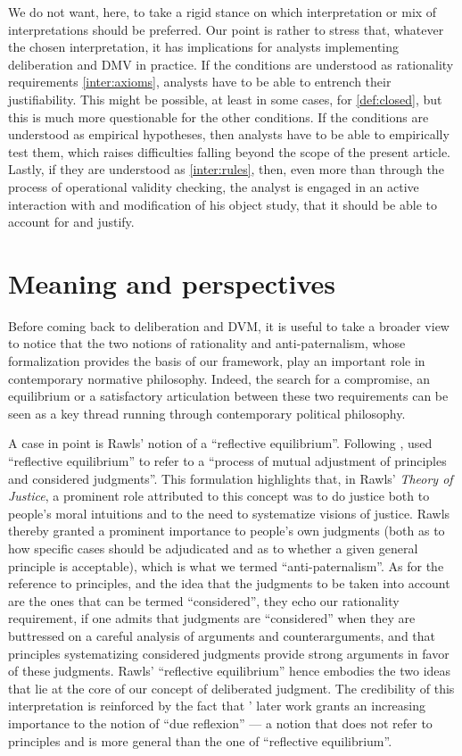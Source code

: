 \documentclass[version=3.21, pagesize, twoside=off, bibliography=totoc, DIV=calc, fontsize=12pt, a4paper, french, english]{scrartcl}
\begin{document}
We do not want, here, to take a rigid stance on which interpretation or mix of interpretations should be preferred. 
Our point is rather to stress that, whatever the chosen interpretation, it has implications for analysts implementing deliberation and DMV in practice. 
If the conditions are understood as rationality requirements \ref{inter:axioms}, analysts have to be able to entrench their justifiability. 
This might be possible, at least in some cases, for \cref{def:closed}, but this is much more questionable for the other conditions. 
If the conditions are understood as empirical hypotheses, then analysts have to be able to empirically test them, which raises difficulties falling beyond the scope of the present article.
Lastly, if they are understood as \ref{inter:rules}, then, even more than through the process of operational validity checking, the analyst is engaged in an active interaction with and modification of his object study, that it should be able to account for and justify.

\section{Meaning and perspectives}
\label{disc}
Before coming back to deliberation and DVM, it is useful to take a broader view to notice that the two notions of rationality and anti-paternalism, whose formalization provides the basis of our framework, play an important role in contemporary normative philosophy. 
Indeed, the search for a compromise, an equilibrium or a satisfactory articulation between these two requirements can be seen as a key thread running through contemporary political philosophy.

A case in point is Rawls’ notion of a “reflective equilibrium”. 
Following \citet{goodman_fact_1983}, \citet[][p. 18]{rawls_theory_1999} used “reflective equilibrium” to refer to a “process of mutual adjustment of principles and considered judgments”. 
This formulation highlights that, in Rawls' \emph{Theory of Justice}, a prominent role attributed to this concept was to do justice both to people's moral intuitions and to the need to systematize visions of justice. 
Rawls thereby granted a prominent importance to people's own judgments (both as to how specific cases should be adjudicated and as to whether a given general principle is acceptable), which is what we termed  “anti-paternalism”. 
As for the reference to principles, and the idea that the judgments to be taken into account are the ones that can be termed “considered”, they echo our rationality requirement, if one admits that judgments are  “considered” when they are buttressed on a careful analysis of arguments and counterarguments, and that principles systematizing considered judgments provide strong arguments in favor of these judgments. 
Rawls' “reflective equilibrium” hence embodies the two ideas that lie at the core of our concept of deliberated judgment. 
The credibility of this interpretation is reinforced by the fact that \citeauthor{rawls_political_2005}’ \citeyearpar{rawls_political_2005} later work grants an increasing importance to the notion of “due reflexion” --- a notion that does not refer to principles and is more general than the one of “reflective equilibrium”.
\end{document}
